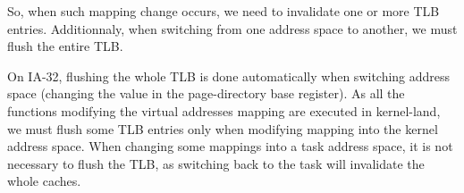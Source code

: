 So, when such mapping change occurs, we need to invalidate one or more
TLB entries. Additionnaly, when switching from one address space to
another, we must flush the entire TLB.

On IA-32, flushing the whole TLB is done automatically when switching
address space (changing the value in the page-directory base
register). As all the functions modifying the virtual addresses
mapping are executed in kernel-land, we must flush some TLB entries
only when modifying mapping into the kernel address space. When
changing some mappings into a task address space, it is not necessary
to flush the TLB, as switching back to the task will invalidate the
whole caches.
